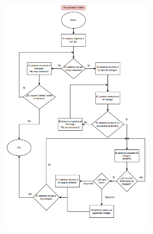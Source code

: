 \documentclass[12pt]{article}
\begin{document}
\begin{figure}[htbp]
	\centering
		\includegraphics[width=0.70\textwidth]{Screenshot 2023-10-05 114526.png}
	\label{fig:Screenshot 2023-10-05 114526}
\end{figure}
\end{document}
